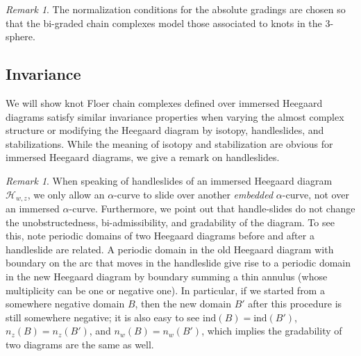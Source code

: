 \documentclass{amsart}
\theoremstyle{definition}
\theoremstyle{remark}
\newtheorem{rmk}[thm]{Remark}
\numberwithin{equation}{section}
\numberwithin{equation}{section} \makeatletter
\begin{document}
\begin{rmk}
The normalization conditions for the absolute gradings are chosen so that the bi-graded chain complexes model those associated to knots in the 3-sphere. 
\end{rmk}
\subsection{Invariance}
We will show knot Floer chain complexes defined over immersed Heegaard diagrams satisfy similar invariance properties when varying the almost complex structure or modifying the Heegaard diagram by isotopy, handleslides, and stabilizations. While the meaning of isotopy and stabilization are obvious for immersed Heegaard diagrams, we give a remark on handleslides. 
\begin{rmk}
When speaking of handleslides of an immersed Heegaard diagram $\mathcal{H}_{w,z}$, we only allow an $\alpha$-curve to slide over another \emph{embedded} $\alpha$-curve, not over an immersed $\alpha$-curve. Furthermore, we point out that handle-slides do not change the unobstructedness, bi-admissibility, and gradability of the diagram. To see this, note periodic domains of two Heegaard diagrams before and after a handleslide are related. A periodic domain in the old Heegaard diagram with boundary on the arc that moves in the handleslide give rise to a periodic domain in the new Heegaard diagram by boundary summing a thin annulus (whose multiplicity can be one or negative one). In particular, if we started from a somewhere negative domain $B$, then the new domain $B'$ after this procedure is still somewhere negative; it is also easy to see $\text{ind}(B)=\text{ind}(B')$, $n_z(B)=n_z(B')$, and $n_w(B)=n_w(B')$, which implies the gradability of two diagrams are the same as well.  
\end{rmk} 
\end{document}
